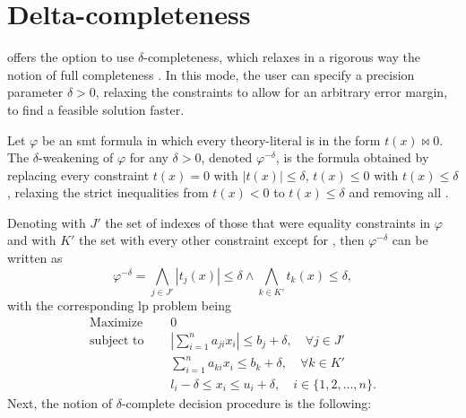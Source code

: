 \documentclass[runningheads]{llncs}
\begin{document}
\section{Delta-completeness}
\label{sec:delta-completeness}

\dlinear offers the option to use $\delta$-completeness, which relaxes in a rigorous way the notion of full completeness \cite{delta-dec}. In this mode, the user can specify a precision parameter $\delta > 0$, relaxing the constraints to allow for an arbitrary error margin, to find a feasible solution faster.

\begin{definition}\cite{delta-dec}
    Let $\varphi$ be an \gls{smt} formula in which every theory-literal is in the form $t(x) \bowtie 0$.
    The $\delta$-weakening of $\varphi$ for any $\delta > 0$, denoted $\varphi^{-\delta}$, is the formula obtained by replacing every constraint $t(x) = 0$ with $|t(x)| \le \delta$, $t(x) \le 0$ with $t(x) \le \delta$, relaxing the strict inequalities from $t(x) < 0$ to $t(x) \le \delta$ and removing all \nqcs.
\end{definition}
Denoting with $J'$ the set of indexes of those that were equality constraints in $\varphi$ and with $K'$ the set with every other constraint except for \nqcs, then $\varphi^{-\delta}$ can be written as
\begin{equation*}
    \varphi^{-\delta} = \bigwedge_{j \in J'} |t_j(x)| \le \delta \wedge \bigwedge_{k \in K'} t_k(x) \le \delta ,
\end{equation*}
with the corresponding \gls{lp} problem being
\begin{equation}
    \label{eq:delta-lp}
    \begin{split}
        \text{Maximize }   \quad & 0                                                                                \\
        \text{subject to } \quad & \left|\sum_{i=1}^{n} a_{ji}x_{i}\right| \le b_j + \delta, \quad \forall j \in J' \\
        \quad                    & \sum_{i=1}^{n} a_{ki}x_{i} \le b_k + \delta, \quad \forall k \in K'              \\
        \quad                    & l_i - \delta \le x_i \le u_i + \delta,  \quad i \in \{1, 2, \ldots, n\} .
    \end{split}
\end{equation}
Next, the notion of $\delta$-complete decision procedure is the following:
\end{document}
